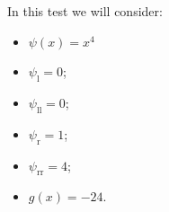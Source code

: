 \documentclass[12pt,a4paper]{article}
\newcommand{\psil}{\psi_\text{l}}
\newcommand{\psill}{\psi_{\text{ll}}}
\newcommand{\psir}{\psi_\text{r}}
\newcommand{\psirr}{\psi_{\text{rr}}}
\begin{document}

\pagebreak
In this test we will consider:
\begin{itemize}
\item $\psi(x)=x^4$
\item $\psil=0$;
\item $\psill=0$;
\item $\psir=1$;
\item $\psirr=4$;
\item $g(x)=-24$.
\end{itemize}


\end{document}
